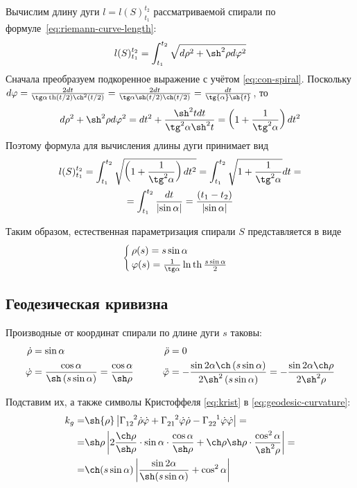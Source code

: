 \documentclass{article}
\numberwithin{equation}{section}
\renewcommand{\phi}{\varphi}
\newcommand{\krist}[3]{\Gamma^{\phantom{#1 #2}#3}_{#1 #2}}
\renewcommand{\th}{\operatorname{th}}
\providecommand{\abs}[1]{\left \lvert{#1}\right \rvert}
\begin{document}
Вычислим длину дуги $l=l(S)_{t_1}^{t_2}$ рассматриваемой спирали по
формуле \eqref{eq:riemann-curve-length}:
\begin{equation*}
  l(S)_{t_1}^{t_2} = \int_{t_1}^{t_2}\sqrt{d\rho^2+\sh^2\rho d\phi^2}
\end{equation*}
Сначала преобразуем подкоренное выражение с учётом
\eqref{eq:con-spiral}. Поскольку $d\phi = \frac{2 dt}{\tg\alpha
  \th(t/2) \ch^2(t/2)} = \frac{2 dt}{\tg\alpha \sh(t/2)
  \ch(t/2)}=\frac{dt}{\tg{\alpha}\sh{t}}$, то
\begin{equation*}  
  d\rho^2+\sh^2\rho d\phi^2 =
  dt^2 + \frac{\sh^2{t} dt}{\tg^2{\alpha}\sh^2{t}}
  =\left(1+\frac{1}{\tg^2{\alpha}}\right) dt^2
\end{equation*}
Поэтому формула для вычисления длины дуги принимает вид
\begin{multline}
  l(S)_{t_1}^{t_2} =
  \int_{t_1}^{t_2}\sqrt{\left(1+\frac{1}{\tg^2{\alpha}}\right)dt^2} =
  \int_{t_1}^{t_2}\sqrt{1+\frac{1}{\tg^2{\alpha}}}dt = \\
  = \int_{t_1}^{t_2}\frac{dt}{\abs{\sin\alpha}} =
  \frac{(t_1 - t_2)}{\abs{\sin\alpha}}
\end{multline}

Таким образом, естественная параметризация спирали $S$ представляется
в виде
\begin{equation}
  \begin{cases}
    \rho(s) = s \sin\alpha\\
    \phi(s) = \frac{1}{\tg\alpha}\ln\th\frac{s \sin\alpha}{2}
  \end{cases}
\end{equation}

\subsection{Геодезическая кривизна}
Производные от координат спирали по длине дуги $s$ таковы:
\begin{align*}
  \dot{\rho} &= \sin\alpha &\qquad \ddot{\rho} &= 0 \\
  \dot{\phi} &= \frac{\cos\alpha}{\sh\left(s \sin\alpha\right)} = \frac{\cos\alpha}{\sh\rho} &\qquad
  \ddot{\phi} &= -\frac{\sin{2\alpha} \ch\left(s \sin\alpha\right)}
                      {2 \sh^2\left(s \sin\alpha\right)} =
                      -\frac{\sin{2\alpha} \ch\rho}{2 \sh^2\rho}
\end{align*}

Подставим их, а также символы Кристоффеля \eqref{eq:krist} в
\eqref{eq:geodesic-curvature}:
\begin{align*}
  k_g =& \sh{\rho} \abs{\krist{1}{2}{2} \dot{\rho} \dot{\phi} +
    \krist{2}{1}{2} \dot{\phi} \dot{\rho} - \krist{2}{2}{1} \dot{\phi}
    \dot {\phi}}= \\
  =& \sh\rho\abs{2\frac{\ch\rho}{\sh\rho}\cdot \sin\alpha \cdot \frac{\cos\alpha}{\sh\rho} +
    \ch\rho \sh\rho \cdot \frac{\cos^2\alpha}{\sh^2\rho}} = \\
  =& \ch(s \sin\alpha) \abs{\frac{\sin{2\alpha}}{\sh(s \sin\alpha)} + \cos^2\alpha}
\end{align*}


\clearpage


\end{document}
